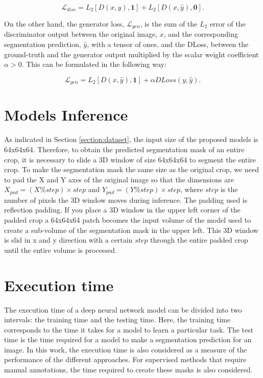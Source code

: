 \begin{equation}
    \mathcal{L}_{disc} = L_2[D(x,y),\boldsymbol{1}] + L_2[D(x,\hat{y}),\boldsymbol{0}].
\end{equation}

On the other hand, the generator loss, $\mathcal{L}_{gen}$, is the sum of the $L_2$ error of the discriminator output between the original image, $x$, and the corresponding segmentation prediction, $\hat{y}$, with a tensor of ones, and the \ac{DLoss}, between the ground-truth and the generator output multiplied by the scalar weight coefficient $\alpha > 0$. This can be formulated in the following way:

\begin{equation}
\label{eq:vox2vox-generator-loss}
    \mathcal{L}_{gen} = L_2[D(x,\hat{y}),\boldsymbol{1}] + \alpha DLoss(y,\hat{y}).
\end{equation}

\section{Models Inference}
\label{section:models_inference}

As indicated in Section \ref{section:dataset}, the input size of the proposed models is 64x64x64. Therefore, to obtain the predicted segmentation mask of an entire crop, it is necessary to slide a \ac{3D} window of size 64x64x64 to segment the entire crop. To make the segmentation mask the same size as the original crop, we need to pad the X and Y axes of the original image so that the dimensions are $X_{pad} = (X \% step) \times step $ and $Y_{pad} = (Y \% step) \times step $, where $step$ is the number of pixels the \ac{3D} window moves during inference. The padding used is reflection padding. If you place a \ac{3D} window in the upper left corner of the padded crop a 64x64x64 patch becomes the input volume of the model used to create a sub-volume of the segmentation mask in the upper left. This \ac{3D} window is slid in x and y direction with a certain $step$ through the entire padded crop until the entire volume is processed.



\section{Execution time}
\label{section:execution_time}

The execution time of a deep neural network model can be divided into two intervals: the training time and the testing time. Here, the training time corresponds to the time it takes for a model to learn a particular task. The test time is the time required for a model to make a segmentation prediction for an image. In this work, the execution time is also considered as a measure of the performance of the different approaches. For supervised methods that require manual annotations, the time required to create these masks is also considered.